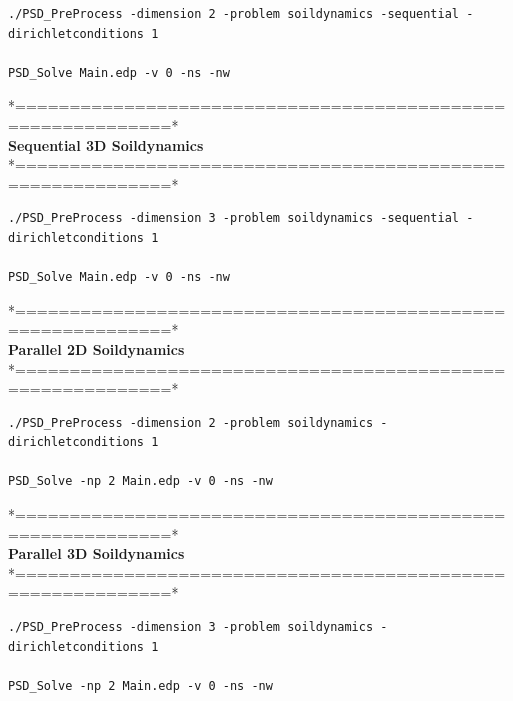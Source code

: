 \begin{lstlisting}[style=Linux]
./PSD_PreProcess -dimension 2 -problem soildynamics -sequential -dirichletconditions 1  

PSD_Solve Main.edp -v 0 -ns -nw
\end{lstlisting}
*============================================================*\\
\textbf{ Sequential 3D Soildynamics  }  \\                    
*============================================================*\\

\begin{lstlisting}[style=Linux]
./PSD_PreProcess -dimension 3 -problem soildynamics -sequential -dirichletconditions 1  

PSD_Solve Main.edp -v 0 -ns -nw
\end{lstlisting}
*============================================================*\\
\textbf{ Parallel 2D Soildynamics  }  \\                    
*============================================================*\\

\begin{lstlisting}[style=Linux]
./PSD_PreProcess -dimension 2 -problem soildynamics -dirichletconditions 1  

PSD_Solve -np 2 Main.edp -v 0 -ns -nw
\end{lstlisting}
*============================================================*\\
\textbf{ Parallel 3D Soildynamics  }     \\                 
*============================================================*\\

\begin{lstlisting}[style=Linux]
./PSD_PreProcess -dimension 3 -problem soildynamics -dirichletconditions 1  

PSD_Solve -np 2 Main.edp -v 0 -ns -nw 
\end{lstlisting}	



